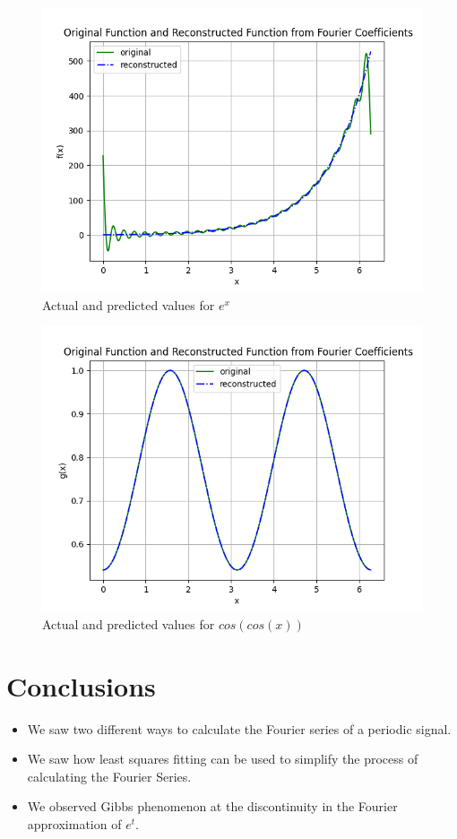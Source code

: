 \documentclass[11pt, a4paper]{article}
\begin{document}
 	\begin{figure}[!tbh]
   	\centering
   	\includegraphics[scale=0.6]{Figure10.png}   
   	\caption{Actual and predicted values for $e^{x}$}
   	\label{fig:sample}
   \end{figure} 
   
   \begin{figure}[!tbh]
   	\centering
   	\includegraphics[scale=0.6]{Figure11.png}   
   	\caption{Actual and predicted values for $cos(cos(x))$}
   	\label{fig:sample}
   \end{figure} 
  
\section*{Conclusions}
\begin{itemize}
\item We saw two different ways to calculate the Fourier series of a periodic signal.
\item We saw how least squares fitting can be used to simplify the process of calculating the Fourier Series.
\item We observed Gibbs phenomenon at the discontinuity in the Fourier approximation of $e^{t}$.
\end{itemize}
\end{document}
